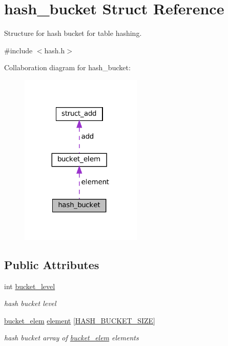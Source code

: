 \hypertarget{structhash__bucket}{}\section{hash\+\_\+bucket Struct Reference}
\label{structhash__bucket}


Structure for hash bucket for table hashing.  




{\ttfamily \#include $<$hash.\+h$>$}



Collaboration diagram for hash\+\_\+bucket\+:\nopagebreak
\begin{figure}[H]
\begin{center}
\leavevmode
\includegraphics[width=164pt]{structhash__bucket__coll__graph}
\end{center}
\end{figure}
\subsection*{Public Attributes}
\begin{DoxyCompactItemize}
\item 
\mbox{\label{structhash__bucket_a22e1e793b45ac131d377ae2113bf3332}} 
int \hyperlink{structhash__bucket_a22e1e793b45ac131d377ae2113bf3332}{bucket\+\_\+level}
\begin{DoxyCompactList}\small\item\em hash bucket level \end{DoxyCompactList}\item 
\mbox{\label{structhash__bucket_a0d731c8704ee8499e99165f094efb61f}} 
\hyperlink{structbucket__elem}{bucket\+\_\+elem} \hyperlink{structhash__bucket_a0d731c8704ee8499e99165f094efb61f}{element} \mbox{[}\hyperlink{constants_8h_a19ad075e8c5150205b814a95e830fd2f}{H\+A\+S\+H\+\_\+\+B\+U\+C\+K\+E\+T\+\_\+\+S\+I\+ZE}\mbox{]}
\begin{DoxyCompactList}\small\item\em hash bucket array of \hyperlink{structbucket__elem}{bucket\+\_\+elem} elements \end{DoxyCompactList}\end{DoxyCompactItemize}



